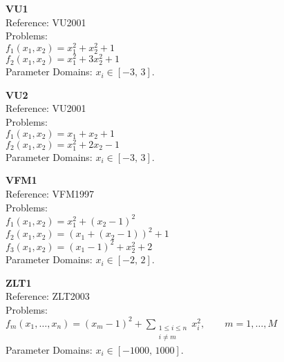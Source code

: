 \documentclass[12pt,a4paper]{article}
\begin{document}
\medskip

\textbf{VU1}\\
Reference: VU2001\\
Problems:\\
$f_1(x_1,x_2) = x_1^2 + x_2^2 + 1$\\
$f_2(x_1,x_2) = x_1^2 + 3x_2^2 + 1$\\
Parameter Domains: $x_i \in [-3,\,3]$.

\medskip

\textbf{VU2}\\
Reference: VU2001\\
Problems:\\
$f_1(x_1,x_2) = x_1 + x_2 + 1$\\
$f_2(x_1,x_2) = x_1^2 + 2x_2 - 1$\\
Parameter Domains: $x_i \in [-3,\,3]$.

\medskip

\textbf{VFM1}\\
Reference: VFM1997\\
Problems:\\
$f_1(x_1,x_2) = x_1^2 + (x_2 - 1)^2$\\
$f_2(x_1,x_2) = (x_1 + (x_2 - 1))^2 + 1$\\
$f_3(x_1,x_2) = (x_1 - 1)^2 + x_2^2 + 2$\\
Parameter Domains: $x_i \in [-2,\,2]$.

\medskip

\textbf{ZLT1}\\
Reference: ZLT2003\\
Problems:\\
$f_m(x_1,\dots,x_n) = (x_m - 1)^2 + \sum_{\substack{1\le i \le n\\ i\ne m}} x_i^2,\qquad m=1,\dots,M$\\
Parameter Domains: $x_i \in [-1000,\,1000]$.

\bigskip
\end{document}
